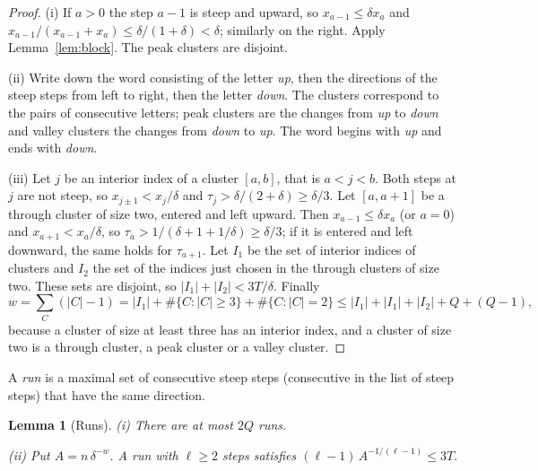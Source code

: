 \documentclass[11pt]{amsart}
\newtheorem{lemma}[theorem]{Lemma}
\theoremstyle{definition}
\theoremstyle{remark}
\begin{document}
\begin{proof}
(i) If $a>0$ the step $a-1$ is steep and upward, so $x_{a-1}\le\delta x_a$ and $x_{a-1}/(x_{a-1}+x_a)\le\delta/(1+\delta)<\delta$; similarly on the right. Apply Lemma~\ref{lem:block}. The peak clusters are disjoint.

(ii) Write down the word consisting of the letter \emph{up}, then the directions of the steep steps from left to right, then the letter \emph{down}. The clusters correspond to the pairs of consecutive letters; peak clusters are the changes from \emph{up} to \emph{down} and valley clusters the changes from \emph{down} to \emph{up}. The word begins with \emph{up} and ends with \emph{down}.

(iii) Let $j$ be an interior index of a cluster $[a,b]$, that is $a<j<b$. Both steps at $j$ are not steep, so $x_{j\pm1}<x_j/\delta$ and $\tau_j>\delta/(2+\delta)\ge\delta/3$.
Let $[a,a+1]$ be a through cluster of size two, entered and left upward. Then $x_{a-1}\le\delta x_a$ (or $a=0$) and $x_{a+1}<x_a/\delta$, so $\tau_a>1/(\delta+1+1/\delta)\ge\delta/3$; if it is entered and left downward, the same holds for $\tau_{a+1}$.
Let $I_1$ be the set of interior indices of clusters and $I_2$ the set of the indices just chosen in the through clusters of size two. These sets are disjoint, so $|I_1|+|I_2|<3T/\delta$.
Finally
\[
w=\sum_C(|C|-1)=|I_1|+\#\{C:|C|\ge3\}+\#\{C:|C|=2\}\le|I_1|+|I_1|+|I_2|+Q+(Q-1),
\]
because a cluster of size at least three has an interior index, and a cluster of size two is a through cluster, a peak cluster or a valley cluster.
\end{proof}

A \emph{run} is a maximal set of consecutive steep steps (consecutive in the list of steep steps) that have the same direction.

\begin{lemma}[Runs]\label{lem:runs}
{\rm(i)} There are at most $2Q$ runs.

{\rm(ii)} Put $A=n\,\delta^{-w}$. A run with $\ell\ge2$ steps satisfies $(\ell-1)\,A^{-1/(\ell-1)}\le3T$.
\end{lemma}
\end{document}
